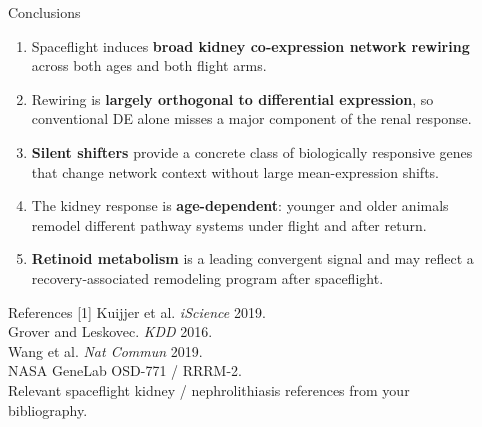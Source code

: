 \documentclass[final]{beamer}
\newlength{\sepwidth}
\newlength{\colwidth}
\newcommand{\separatorcolumn}{\begin{column}{\sepwidth}\end{column}}
\begin{document}
\begin{frame}[t]
\begin{columns}[t]
\begin{column}{\colwidth}
\begin{alertblock}{Conclusions}
\begin{enumerate}
  \item Spaceflight induces \textbf{broad kidney co-expression network rewiring} across both ages and both flight arms.
  \item Rewiring is \textbf{largely orthogonal to differential expression}, so conventional DE alone misses a major component of the renal response.
  \item \textbf{Silent shifters} provide a concrete class of biologically responsive genes that change network context without large mean-expression shifts.
  \item The kidney response is \textbf{age-dependent}: younger and older animals remodel different pathway systems under flight and after return.
  \item \textbf{Retinoid metabolism} is a leading convergent signal and may reflect a recovery-associated remodeling program after spaceflight.
\end{enumerate}
\end{alertblock}

\begin{block}{References}
\footnotesize
[1] Kuijjer et al. \textit{iScience} 2019. \\
[2] Grover and Leskovec. \textit{KDD} 2016. \\
[3] Wang et al. \textit{Nat Commun} 2019. \\
[4] NASA GeneLab OSD-771 / RRRM-2. \\
[5] Relevant spaceflight kidney / nephrolithiasis references from your bibliography.
\end{block}

\end{column}

\separatorcolumn
\end{columns}
\end{frame}
\end{document}
